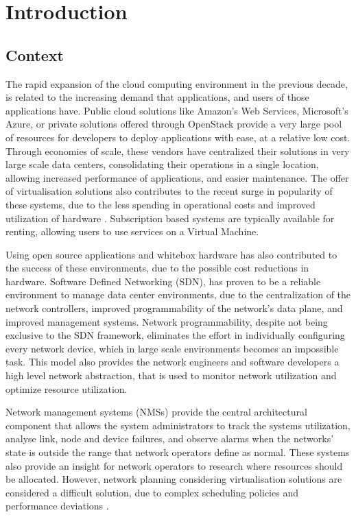 \chapter{Introduction} \label{chap:introduction} 

\section {Context} \label{context}

\par The rapid expansion of the cloud computing environment in the previous decade, is related to the increasing demand that applications, and users of those 
applications have. Public cloud solutions like Amazon's Web Services, Microsoft's Azure, or private solutions offered through OpenStack provide a very large
pool of resources for developers to deploy applications with ease, at a relative low cost. Through economies of scale, these vendors have centralized their 
solutions in very large scale data centers, consolidating their operations in a single location, allowing increased performance of applications, and easier 
maintenance. The offer of virtualisation solutions also contributes to the recent surge in popularity of these systems, due to the less spending in operational 
costs and improved utilization of hardware \cite{sims_david_carousels_2011}. Subscription based systems are typically available for renting, allowing users to
use services on a Virtual Machine.

\par Using open source applications and whitebox hardware has also contributed to the success of these environments, due to the possible cost reductions in 
hardware. Software Defined Networking (SDN), has proven to be a reliable environment to manage data center environments, due to the centralization of the network
controllers, improved programmability of the network's data plane, and improved management systems. Network programmability, despite not being exclusive to the 
SDN framework, eliminates the effort in individually configuring every network device, which in large scale environments becomes an impossible task. This model
also provides the network engineers and software developers a high level network abstraction, that is used to monitor network utilization and optimize resource
utilization. 

\par Network management systems (NMSs) provide the central architectural component that allows the system administrators to track the systems utilization, 
analyse link, node and device failures, and observe alarms when the networks' state is outside the range that network operators define as normal. These systems
also provide an insight for network operators to research where resources should be allocated. However, network planning considering virtualisation solutions 
are considered a difficult solution, due to complex scheduling policies and performance deviations \cite{sampaio_energy-efficient_2015}. 

